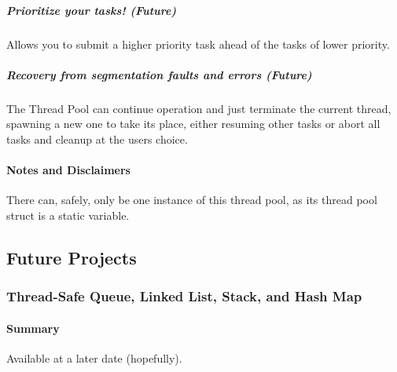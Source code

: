 \subparagraph*{Prioritize your tasks! (Future)}

Allows you to submit a higher priority task ahead of the tasks of lower priority.

\subparagraph*{Recovery from segmentation faults and errors (Future)}

The Thread Pool can continue operation and just terminate the current thread, spawning a new one to take it\textquotesingle{}s place, either resuming other tasks or abort all tasks and cleanup at the user\textquotesingle{}s choice.

\paragraph*{Notes and Disclaimers}

There can, safely, only be one instance of this thread pool, as it\textquotesingle{}s thread pool struct is a static variable.

\subsection*{Future Projects}

\subsubsection*{Thread-\/\+Safe Queue, Linked List, Stack, and Hash Map}

\paragraph*{Summary}

Available at a later date (hopefully). 